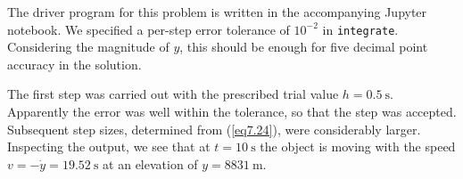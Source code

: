 \documentclass[12pt]{article}
\begin{document}
The driver program for this problem is written in the accompanying Jupyter notebook. We specified a per-step error tolerance of $10^{-2}$ in \texttt{integrate}.  Considering the magnitude of $y$, this should be enough for five decimal point accuracy in the solution.
\par
The first step was carried out with the prescribed trial value $h = \SI{0.5}{\second}$. Apparently
the error was well within the tolerance, so that the step was accepted. Subsequent
step sizes, determined from (\ref{eq7.24}), were considerably larger. Inspecting the output, we see that at $t = \SI{10}{\second}$ the object is moving with the speed $v = -\Dot{y} = \SI{19.52}{\second}$ at an elevation of $y = \SI{8831}{\metre}$.
\end{document}
